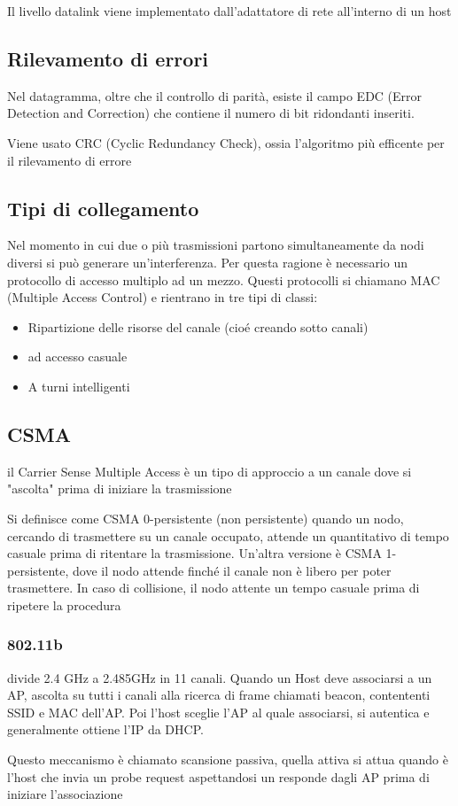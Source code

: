 \documentclass[12pt, a4paper]{article}
\begin{document}
Il livello datalink viene implementato dall'adattatore di rete all'interno di un host

\subsection{Rilevamento di errori}
Nel datagramma, oltre che il controllo di parità, esiste il campo EDC (Error Detection and Correction) 
che contiene il numero di bit ridondanti inseriti. 

Viene usato CRC (Cyclic Redundancy Check), ossia l'algoritmo più efficente per il rilevamento di errore



\subsection{Tipi di collegamento}
Nel momento in cui due o più trasmissioni partono simultaneamente da nodi diversi si può generare un'interferenza.
Per questa ragione è necessario un protocollo di accesso multiplo ad un mezzo. Questi protocolli si chiamano MAC
(Multiple Access Control) e rientrano in tre tipi di classi:
\begin{itemize}
    \item Ripartizione delle risorse del canale (cioé creando sotto canali)
    \item ad accesso casuale
    \item A turni intelligenti
\end{itemize}


\subsection{CSMA}
il Carrier Sense Multiple Access è un tipo di approccio a un canale dove si "ascolta" prima di iniziare la 
trasmissione

Si definisce come CSMA 0-persistente (non persistente) quando un nodo, cercando di trasmettere su un canale
occupato, attende un quantitativo di tempo casuale prima di ritentare la trasmissione. Un'altra versione è
CSMA 1-persistente, dove il nodo attende finché il canale non è libero per poter trasmettere. In caso di 
collisione, il nodo attente un tempo casuale prima di ripetere la procedura


\subsubsection{802.11b}
divide 2.4 GHz a 2.485GHz in 11 canali. Quando un Host deve associarsi a un AP, ascolta su tutti i canali
alla ricerca di frame chiamati beacon, contententi SSID e MAC dell'AP. Poi l'host sceglie l'AP al quale 
associarsi, si autentica e generalmente ottiene l'IP da DHCP.

Questo meccanismo è chiamato scansione passiva, quella attiva si attua quando è l'host che invia un probe 
request aspettandosi un responde dagli AP prima di iniziare l'associazione
\end{document}
